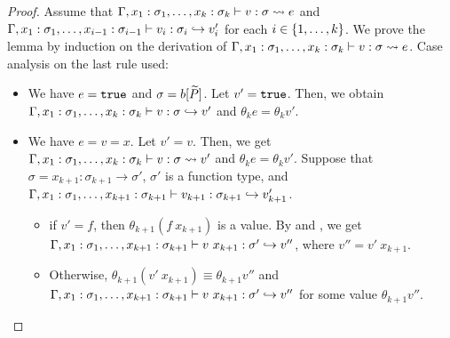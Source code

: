 \begin{proof}
Assume that \(\Gamma,x_1:\sigma_1,\dots,x_k:\sigma_k \vdash v : \sigma \leadsto e\) and
\(\Gamma,x_1:\sigma_1,\dots,x_{i-1}:\sigma_{i-1} \vdash v_i : \sigma_i \hookrightarrow v_i'\) for each \(i \in \{1,\dots,k\}\).
We prove the lemma by induction on the derivation of
\(\Gamma,x_1:\sigma_1,\dots,x_k:\sigma_k \vdash v : \sigma \leadsto e\). Case analysis on the last rule used:
\begin{itemize}

\item[] 
We have \(e=\mathtt{true}\) and \(\sigma=b[\widetilde{P}]\).
Let \(v'=\mathtt{true}\).
Then, we obtain \(\Gamma,x_1:\sigma_1,\dots,x_k:\sigma_k \vdash v : \sigma \hookrightarrow v'\) and
\(\theta_k e=\theta_k v'\).


\item[] 
We have \(e=v=x\).
Let \(v'=v\).
Then, we get \(\Gamma,x_1:\sigma_1,\dots,x_k:\sigma_k \vdash v : \sigma \leadsto v'\) and
\(\theta_k e=\theta_k v'\).
%
Suppose that \(\sigma=x_{k+1}:\sigma_{k+1} \to \sigma'\),
\(\sigma'\) is a function type, and
\(\Gamma,x_1:\sigma_1,\dots,x_{k+1}:\sigma_{k+1} \vdash v_{k+1} : \sigma_{k+1} \hookrightarrow v_{k+1}'\).
\begin{itemize}
\item if \(v'=f\), then \(\theta_{k+1} (f\ x_{k+1})\) is a value.
By  and , we get
\(\TT{\Gamma,x_1:\sigma_1,\dots,x_{k+1}:\sigma_{k+1}}{v\ x_{k+1}}{\sigma'}{v''}\), where
\(v''=v'\ x_{k+1}\).
\item Otherwise, \(\theta_{k+1} (v'\ x_{k+1}) \equiv \theta_{k+1} v''\) and
\(\TT{\Gamma,x_1:\sigma_1,\dots,x_{k+1}:\sigma_{k+1}}{v\ x_{k+1}}{\sigma'}{v''}\)
for some value \(\theta_{k+1} v''\).
\end{itemize}


\end{itemize}
\end{proof}
